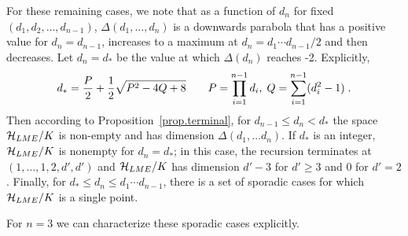 \documentclass[12pt]{article}
\theoremstyle{definition}
\begin{document}
For these remaining cases, we note that as a function of $d_n$ for fixed $(d_1,d_2,\dots,d_{n-1})$,  $\Delta(d_1,\dots,d_n)$ is a downwards parabola that has a positive value for $d_n = d_{n-1}$, increases to a maximum at $d_n = d_1 \cdots d_{n-1}/2$ and then decreases. Let $d_n = d_*$ be the value at which $\Delta(d_n)$ reaches -2. Explicitly,
\[
d_* = {P \over 2} + {1 \over 2}\sqrt{P^2 - 4 Q + 8} \qquad  P = \prod_{i=1}^{n-1} d_i,\;  Q = \sum_{i=1}^{n-1} (d_i^2 - 1) \; .
\]
Then according to Proposition~\ref{prop.terminal}, for $d_{n-1} \le d_n < d_*$ the space ${\cal H}_{LME}/K$ is non-empty and has dimension $\Delta(d_1, \dots d_n)$.  If $d_*$ is an integer, ${\cal H}_{LME}/K$ is nonempty for $d_n= d_*$; in this case, the recursion terminates at $(1,\dots,1,2,d',d')$ and ${\cal H}_{LME}/K$ has dimension $d'-3$ for $d' \ge 3$ and $0$ for $d' = 2$. Finally, for $d_* \le d_n \le d_1 \cdots d_{n-1}$, there is a set of sporadic cases for which ${\cal H}_{LME}/K$ is a single point.

For $n=3$ we can characterize these sporadic cases explicitly.
\end{document}
